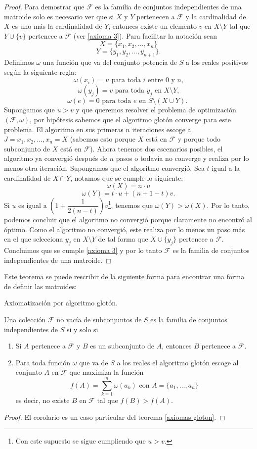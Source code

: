 \begin{proof}
Para demostrar que $\mathcal{F}$ es la familia de conjuntos independientes de una matroide solo es necesario ver que si $X$ y $Y$ pertenecen a $\mathcal{F}$ y la cardinalidad de $X$ es uno más la cardinalidad de $Y$, entonces existe un elemento $v$ en $X \setminus Y$ tal que $Y \cup \{v\} $ pertenece a $\mathcal{F}$ (ver \ref{axioma 3}). Para facilitar la notación sean 
$$X = \{x_1,x_2,\dots,x_n \}$$ $$Y = \{y_1,y_2,\dots,y_{n+1}\}.$$
Definimos $\omega$ una función que va del conjunto potencia de $S$ a los reales positivos según la siguiente regla:
$$\omega(x_i)=u \text{ para toda $i$ entre $0$ y $n$,}$$
$$\omega(y_j)=v \text{ para toda $y_j$ en $X \setminus Y$,}$$
$$\omega(e)=0 \text{ para toda $e$ en $S \setminus(X \cup Y)$. }$$
Supongamos que $u>v$ y que queremos resolver el problema de optimización $(\mathcal{F}, \omega)$, por hipótesis sabemos que el algoritmo glotón converge para este problema. El algoritmo en sus primeras $n$ iteraciones escoge a $J={x_1,x_2,\dots,x_n}=X$ (sabemos esto porque $X$ está en $\mathcal{F}$ y porque todo subconjunto de $X$ está en $\mathcal{F}$). Ahora tenemos dos escenarios posibles, el algoritmo ya convergió después de $n$ pasos o todavía no converge y realiza por lo menos otra iteración. 
Supongamos que el algoritmo convergió. Sea $t$ igual a la cardinalidad de $X \cap Y$, notamos que se cumple lo siguiente:
$$\omega(X)= n\cdot u$$
$$\omega(Y) = t \cdot u + (n+1-t)v.$$
Si $u$ es igual a $\left(1+\dfrac{1}{2(n-t)}\right)v$\footnote{Con este supuesto se sigue cumpliendo que $u>v$.}, tenemos que $ \omega(Y) > \omega(X)$. Por lo tanto, podemos concluir que el algoritmo no convergió porque claramente no encontró al óptimo. Como el algoritmo no convergió, este realiza por lo menos un paso más en el que selecciona $y_j$ en $X \setminus Y$ de tal forma que $X \cup \{y_j\}$ pertenece a $\mathcal{F}$. Concluimos que se cumple \ref{axioma 3} y por lo tanto $\mathcal{F}$ es la familia de conjuntos independientes de una matroide. 
\end{proof}

Este teorema se puede rescribir de la siguiente forma para encontrar una forma de definir las matroides:

\begin{cor}{Axiomatización por algoritmo glotón.}

Una colección $\mathcal{F}$ no vacía de subconjuntos de $S$ es la familia de conjuntos independientes de $S$ si y solo si 
\begin{enumerate}
\item Si $A$ pertenece a $\mathcal{F}$ y $B$ es un subconjunto de $A$, entonces $B$ pertenece a $\mathcal{F}$.
\item Para toda función $\omega$ que va de $S$ a los reales el algoritmo glotón escoge al conjunto $A$ en $\mathcal{F}$ que maximiza la función 
$$f(A) = \sum_{k=1}^{n}\omega(a_k) \text{ con } A=\{a_1,\dots,a_n\}$$ es decir, no existe $B$ en $\mathcal{F}$ tal que $f(B)>f(A)$.
\end{enumerate}
\end{cor}

\begin{proof}
El corolario es un caso particular del teorema \ref{axiomas gloton}.
\end{proof}



